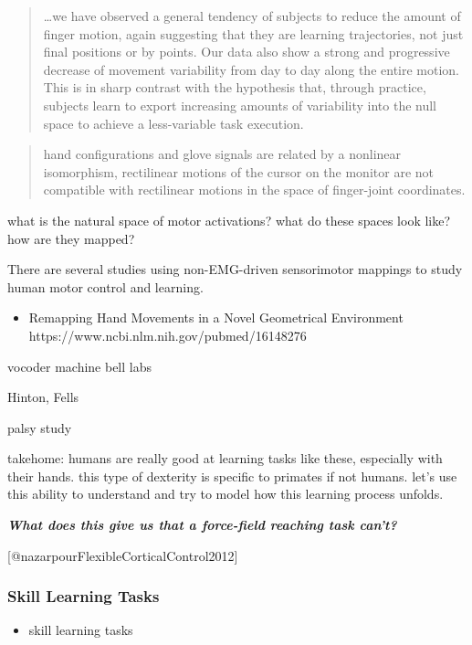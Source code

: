 \documentclass[../main.tex]{subfiles}
\begin{document}
{{{{{{{{{{{\begin{quote}
\ldots we have observed a general tendency of subjects to reduce the
amount of finger motion, again suggesting that they are learning
trajectories, not just final positions or by points. Our data also show
a strong and progressive decrease of movement variability from day to
day along the entire motion. This is in sharp contrast with the
hypothesis that, through practice, subjects learn to export increasing
amounts of variability into the null space to achieve a less-variable
task execution.
\end{quote}

\begin{quote}
hand configurations and glove signals are related by a nonlinear
isomorphism, rectilinear motions of the cursor on the monitor are not
compatible with rectilinear motions in the space of finger-joint
coordinates.
\end{quote}

what is the natural space of motor activations? what do these spaces
look like? how are they mapped?

There are several studies using non-EMG-driven sensorimotor mappings to
study human motor control and learning.

\begin{itemize}
\tightlist
\item
  Remapping Hand Movements in a Novel Geometrical Environment
  https://www.ncbi.nlm.nih.gov/pubmed/16148276
\end{itemize}

vocoder machine bell labs

Hinton, Fells

palsy study

takehome: humans are really good at learning tasks like these,
especially with their hands. this type of dexterity is specific to
primates if not humans. let's use this ability to understand and try to
model how this learning process unfolds.

\textbf{\emph{What does this give us that a force-field reaching task
can't?}}

{[}@nazarpourFlexibleCorticalControl2012{]}

\subsubsection{Skill Learning Tasks}\label{skill-learning-tasks}

\begin{itemize}
\tightlist
\item
  skill learning tasks


\end{itemize}}}}}}}}}}}}
\end{document}
